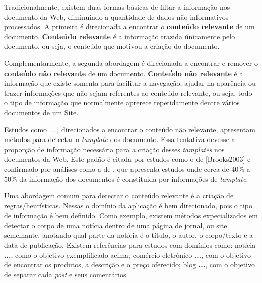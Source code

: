 \documentclass{acm_proc_article-sp}
\newcommand{\remove}[1]{}
\numberwithin{equation}{section}
\begin{document}
Tradicionalmente, existem duas formas básicas de filtar a informação nos 
	documento da Web, diminuindo a quantidade de dados não informativos 
	processados.
A primeira é direcionada a encontrar o {\bf conteúdo relevante} de um 
	documento. {\bf Conteúdo relevante} é a informação trazida únicamente pelo 
	documento, ou seja,
		o conteúdo que motivou a criação do documento.

Complementarmente, a segunda abordagem é direcionada a encontrar e remover o 
	{\bf conteúdo não relevante} de um documento. {\bf Conteúdo não relevante} 
	é a informação que existe somenta para facilitar a navegação,
	ajudar na aparência ou trazer informações que não sejam referentes ao 
	conteúdo relevante, ou seja,
		todo o tipo de informação que normalmente aprerece repetidamente 
		dentre vários documentos de um Site.


Estudos como [...] direcionados a encontrar o conteúdo não relevante,
apresentam métodos para detectar o {\it tamplate} dos documento.
	Essa tentativa devesse a proporção de informação necessária para a criação
	desses {\it tamplates} nos documentos da Web. Este padão é 
	citada por estudos como o de [Brooks2003] e confirmado por análises 
	como a de \cite{Gibson2005}, que apresenta estudos onde cerca de 
	$40\%$ a $50\%$ da informação dos documentos é constituida por informações
	de {\it tamplate}.


Uma abordagem comum para detectar o conteúdo relevante é a criação de
regras/heurísticas. 
	Nessas 
		o domínio da aplicação é bem direcionado, pois o tipo de informação é 
		bem definido.
		Como exemplo,
			existem métodos expecializados em detectar o corpo de uma notícia 
			dentro de uma página de jornal, ou site semelhante,
			anotando qual parte da notícia é 
				o título,
				o autor, o corpo/texto e
				a data de publicação.
			Existem referências para estudos com domínios como:
				notícia {\bf \cite{}...}, como o objetivo exemplificado acima;
				comércio eletrônico {\bf \cite{}...}, com o objetivo de 
				encontrar os produtos, a descrição e o preço oferecido;
				blog {\bf \cite{}...}, com o objetivo de separar cada 
				{\it post} e seus comentários.


\remove{
Embora estudos como \cite{}... apresentem resutados "interessantes" na detecção de templates, 
}






\end{document}
